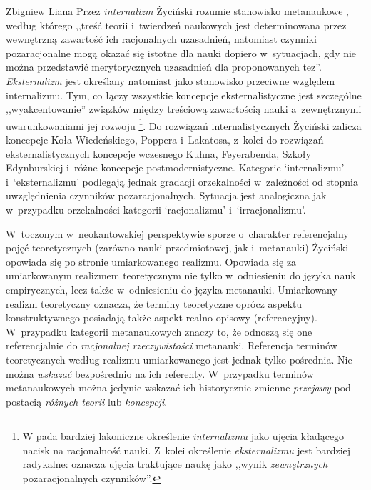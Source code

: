 \begin{artplenv}{Zbigniew Liana}
Przez \textit{internalizm} Życiński rozumie stanowisko metanaukowe
\parencite*[s.~134]{zycinski_elementy_1996},
według którego ,,treść teorii i~twierdzeń naukowych jest determinowana przez wewnętrzną zawartość ich racjonalnych
uzasadnień, natomiast czynniki pozaracjonalne mogą okazać się istotne dla nauki dopiero w~sytuacjach, gdy nie można
przedstawić merytorycznych uzasadnień dla proponowanych tez''.  \textit{Eksternalizm} jest określany natomiast jako
stanowisko przeciwne względem internalizmu. Tym, co łączy wszystkie koncepcje eksternalistyczne jest szczególne
,,wyakcentowanie'' związków między treściową zawartością nauki a~zewnętrznymi uwarunkowaniami jej rozwoju
\parencite[s.~134]{zycinski_elementy_1996}\footnote{W
\parencite[s.~242]{zycinski_granice_1993}
pada bardziej lakoniczne określenie \textit{internalizmu} jako
ujęcia kładącego nacisk na racjonalność nauki. Z~kolei określenie \textit{eksternalizmu} jest bardziej radykalne: oznacza
ujęcia traktujące naukę jako ,,wynik \textit{zewnętrznych} pozaracjonalnych czynników''.}. Do rozwiązań internalistycznych
Życiński zalicza koncepcje Koła Wiedeńskiego, Poppera i~Lakatosa, z~kolei do rozwiązań eksternalistycznych koncepcje
wczesnego Kuhna, Feyerabenda, Szkoły Edynburskiej i~różne koncepcje postmodernistyczne. Kategorie
`internalizmu' i~`eksternalizmu' podlegają jednak gradacji orzekalności w~zależności od stopnia uwzględnienia czynników
pozaracjonalnych. Sytuacja jest analogiczna jak w~przypadku orzekalności kategorii `racjonalizmu' i~`irracjonalizmu'.

\begin{uwaga}
W~toczonym w~neokantowskiej perspektywie sporze o~charakter referencjalny pojęć teoretycznych (zarówno
nauki przedmiotowej, jak i~metanauki) Życiński opowiada się po stronie umiarkowanego realizmu. Opowiada się za
umiarkowanym realizmem teoretycznym nie tylko w~odniesieniu do języka nauk empirycznych, lecz także w~odniesieniu do
języka metanauki. Umiarkowany realizm teoretyczny oznacza, że terminy teoretyczne oprócz aspektu konstruktywnego
posiadają także aspekt realno-opisowy (referencyjny). W~przypadku kategorii metanaukowych znaczy to, że odnoszą się one
referencjalnie do \textit{racjonalnej rzeczywistości} metanauki. Referencja terminów teoretycznych według realizmu
umiarkowanego jest jednak tylko pośrednia. Nie można \textit{wskazać }bezpośrednio na ich referenty. W~przypadku terminów
metanaukowych można jedynie wskazać ich historycznie zmienne \textit{przejawy} pod postacią \textit{różnych teorii}
lub \textit{koncepcji}.
\end{uwaga}


\end{artplenv}
